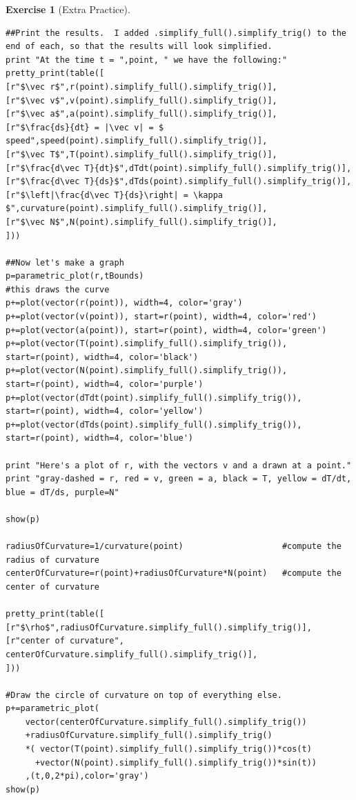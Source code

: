 \documentclass[10pt,]{book}
\theoremstyle{plain}
\theoremstyle{definition}
\theoremstyle{definition}
\theoremstyle{definition}
\theoremstyle{definition}
\newtheorem{exploration}[project]{Exercise}
\theoremstyle{definition}
\numberwithin{equation}{section}
\begin{document}
\begin{exploration}[Extra Practice]
\begin{lstlisting}[style=sageinput]
##Print the results.  I added .simplify_full().simplify_trig() to the end of each, so that the results will look simplified.
print "At the time t = ",point, " we have the following:"
pretty_print(table([
[r"$\vec r$",r(point).simplify_full().simplify_trig()],
[r"$\vec v$",v(point).simplify_full().simplify_trig()],
[r"$\vec a$",a(point).simplify_full().simplify_trig()],
[r"$\frac{ds}{dt} = |\vec v| = $ speed",speed(point).simplify_full().simplify_trig()],
[r"$\vec T$",T(point).simplify_full().simplify_trig()],
[r"$\frac{d\vec T}{dt}$",dTdt(point).simplify_full().simplify_trig()],
[r"$\frac{d\vec T}{ds}$",dTds(point).simplify_full().simplify_trig()],
[r"$\left|\frac{d\vec T}{ds}\right| = \kappa $",curvature(point).simplify_full().simplify_trig()],
[r"$\vec N$",N(point).simplify_full().simplify_trig()],
]))

##Now let's make a graph
p=parametric_plot(r,tBounds)                                        #this draws the curve
p+=plot(vector(r(point)), width=4, color='gray')
p+=plot(vector(v(point)), start=r(point), width=4, color='red')
p+=plot(vector(a(point)), start=r(point), width=4, color='green')
p+=plot(vector(T(point).simplify_full().simplify_trig()), start=r(point), width=4, color='black')
p+=plot(vector(N(point).simplify_full().simplify_trig()), start=r(point), width=4, color='purple')
p+=plot(vector(dTdt(point).simplify_full().simplify_trig()), start=r(point), width=4, color='yellow')
p+=plot(vector(dTds(point).simplify_full().simplify_trig()), start=r(point), width=4, color='blue')

print "Here's a plot of r, with the vectors v and a drawn at a point."
print "gray-dashed = r, red = v, green = a, black = T, yellow = dT/dt, blue = dT/ds, purple=N"

show(p)

radiusOfCurvature=1/curvature(point)                    #compute the radius of curvature
centerOfCurvature=r(point)+radiusOfCurvature*N(point)   #compute the center of curvature

pretty_print(table([
[r"$\rho$",radiusOfCurvature.simplify_full().simplify_trig()],
[r"center of curvature", centerOfCurvature.simplify_full().simplify_trig()],
]))

#Draw the circle of curvature on top of everything else.
p+=parametric_plot(
    vector(centerOfCurvature.simplify_full().simplify_trig())
    +radiusOfCurvature.simplify_full().simplify_trig()
    *( vector(T(point).simplify_full().simplify_trig())*cos(t)
      +vector(N(point).simplify_full().simplify_trig())*sin(t))
    ,(t,0,2*pi),color='gray')
show(p)


\end{lstlisting}
\end{exploration}
\end{document}

